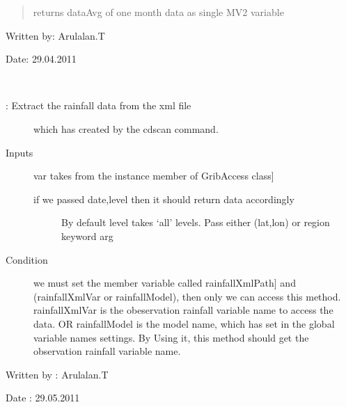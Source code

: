\documentclass[letterpaper,10pt,english]{sphinxmanual}
\begin{document}
\begin{fulllineitems}
\begin{fulllineitems}
\begin{quote}
\begin{description}
returns dataAvg of one month data as single MV2 variable

\end{description}
\end{quote}

Written by: Arulalan.T

Date: 29.04.2011

\end{fulllineitems}


\begin{fulllineitems}
\label{diagnosisutils:xml_data_access.GribXmlAccess.getRainfallData}~\begin{description}
\item[{{\hyperref[diagnosisutils:xml_data_access.GribXmlAccess.getRainfallData]{}}: Extract the rainfall data from the xml file}] \leavevmode
which has created by the cdscan command.

\item[{Inputs}] \leavevmode{[}var takes from the instance member of GribAccess class{]}\begin{description}
\item[{if we passed date,level then it should return data accordingly}] \leavevmode
By default level takes `all' levels.
Pass either (lat,lon) or region keyword arg

\end{description}

\item[{Condition}] \leavevmode{[}we must set the member variable called rainfallXmlPath{]}
and (rainfallXmlVar or rainfallModel), then only we can
access this method. rainfallXmlVar is the obeservation
rainfall variable name to access the data. OR
rainfallModel is the model name, which has set in the
global variable names settings. By Using it, this method
should get the observation rainfall variable name.

\end{description}

Written by : Arulalan.T

Date : 29.05.2011

\end{fulllineitems}



\end{fulllineitems}
\end{document}
